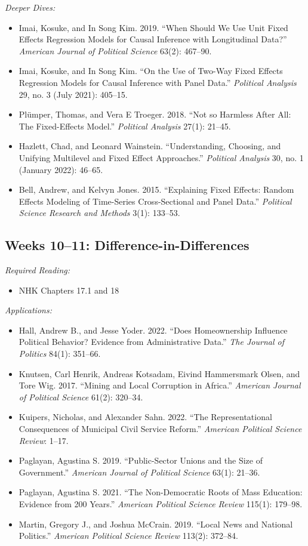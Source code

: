 \documentclass[11pt, letterpaper]{article}
\begin{document}
\noindent \textit{Deeper Dives:}

\begin{itemize}
	\item Imai, Kosuke, and In Song Kim. 2019. ``When Should We Use Unit Fixed Effects Regression Models for Causal Inference with Longitudinal Data?'' \textit{American Journal of Political Science} 63(2): 467–90.
	\item Imai, Kosuke, and In Song Kim. ``On the Use of Two-Way Fixed Effects Regression Models for Causal Inference with Panel Data.'' \textit{Political Analysis} 29, no. 3 (July 2021): 405–15.
	\item Plümper, Thomas, and Vera E Troeger. 2018. “Not so Harmless After All: The Fixed-Effects Model.” \textit{Political Analysis} 27(1): 21–45.
	\item Hazlett, Chad, and Leonard Wainstein. ``Understanding, Choosing, and Unifying Multilevel and Fixed Effect Approaches.'' \textit{Political Analysis} 30, no. 1 (January 2022): 46–65.
	\item Bell, Andrew, and Kelvyn Jones. 2015. “Explaining Fixed Effects: Random Effects Modeling of Time-Series Cross-Sectional and Panel Data.” \textit{Political Science Research and Methods} 3(1): 133–53.
\end{itemize}

\subsection*{Weeks 10--11: Difference-in-Differences}

\textit{Required Reading:}

\begin{itemize}
	\item NHK Chapters 17.1 and 18
\end{itemize}

\noindent \textit{Applications:}

\begin{itemize}
	\item Hall, Andrew B., and Jesse Yoder. 2022. ``Does Homeownership Influence Political Behavior? Evidence from Administrative Data.'' \textit{The Journal of Politics} 84(1): 351–66.
	\item Knutsen, Carl Henrik, Andreas Kotsadam, Eivind Hammersmark Olsen, and Tore Wig. 2017. ``Mining and Local Corruption in Africa.'' \textit{American Journal of Political Science} 61(2): 320–34.
	\item Kuipers, Nicholas, and Alexander Sahn. 2022. ``The Representational Consequences of Municipal Civil Service Reform.'' \textit{American Political Science Review}: 1–17.
	\item Paglayan, Agustina S. 2019. ``Public-Sector Unions and the Size of Government.'' \textit{American Journal of Political Science} 63(1): 21–36.
	\item Paglayan, Agustina S. 2021. ``The Non-Democratic Roots of Mass Education: Evidence from 200 Years.'' \textit{American Political Science Review} 115(1): 179–98.
	\item Martin, Gregory J., and Joshua McCrain. 2019. “Local News and National Politics.” \textit{American Political Science Review} 113(2): 372–84.
\end{itemize}
\end{document}
